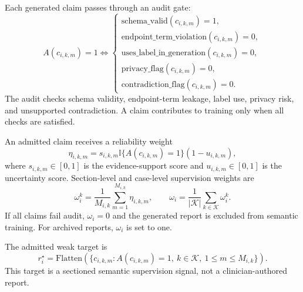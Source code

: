 Each generated claim passes through an audit gate:
\begin{equation}
A(c_{i,k,m})=1
\Longleftrightarrow
\begin{cases}
\mathrm{schema\_valid}(c_{i,k,m})=1,\\
\mathrm{endpoint\_term\_violation}(c_{i,k,m})=0,\\
\mathrm{uses\_label\_in\_generation}(c_{i,k,m})=0,\\
\mathrm{privacy\_flag}(c_{i,k,m})=0,\\
\mathrm{contradiction\_flag}(c_{i,k,m})=0.
\end{cases}
\label{eq:mosaic_claim_audit_gate_final_topcs}
\end{equation}
The audit checks schema validity, endpoint-term leakage, label use, privacy risk, and unsupported contradiction. A claim contributes to training only when all checks are satisfied.

An admitted claim receives a reliability weight
\begin{equation}
\eta_{i,k,m}
=
s_{i,k,m}\mathbb{I}\{A(c_{i,k,m})=1\}(1-u_{i,k,m}),
\label{eq:mosaic_claim_reliability_final_topcs}
\end{equation}
where $s_{i,k,m}\in[0,1]$ is the evidence-support score and $u_{i,k,m}\in[0,1]$ is the uncertainty score. Section-level and case-level supervision weights are
\begin{equation}
\omega_i^k=
\frac{1}{M_{i,k}}\sum_{m=1}^{M_{i,k}}\eta_{i,k,m},
\qquad
\omega_i=
\frac{1}{|\mathcal{K}|}\sum_{k\in\mathcal{K}}\omega_i^k.
\label{eq:mosaic_section_case_weight_final_topcs}
\end{equation}
If all claims fail audit, $\omega_i=0$ and the generated report is excluded from semantic training. For archived reports, $\omega_i$ is set to one.

The admitted weak target is
\begin{equation}
r_i^{\star}
=
\mathrm{Flatten}
\left(
\{c_{i,k,m}:A(c_{i,k,m})=1,\ k\in\mathcal{K},\ 1\leq m\leq M_{i,k}\}
\right).
\label{eq:mosaic_admitted_target_final_topcs}
\end{equation}
This target is a sectioned semantic supervision signal, not a clinician-authored report.

